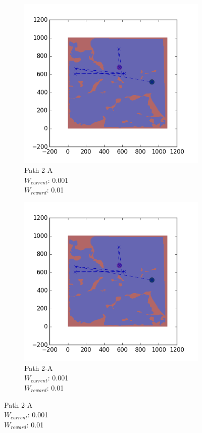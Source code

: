 \documentclass{tamuccthesis}
\begin{document}
\begin{figure}
\begin{subfigure}[b]{0.24\textwidth}
        \includegraphics[width=\textwidth,trim={4cm 3cm 2cm 3cm},clip]{EXP3RG_PathBa_-1_-1_0d001_0d01.png}
        \caption[]{{\small Path 2-A \\ $W_{current}$: 0.001 \\ $W_{reward}$: 0.01}}
        \label{fig:Path_2-A_upReward_upWork}
    \end{subfigure}
    \begin{subfigure}[b]{0.24\textwidth}
        \centering
        \includegraphics[width=\textwidth,trim={4cm 3cm 2cm 3cm},clip]{EXP3RG_PathBa_-1_-1_0d001_0d01.png}
        \caption[]{{\small Path 2-A \\ $W_{current}$: 0.001 \\ $W_{reward}$: 0.01}}
        \label{fig:Path_3-A_upReward_upWork}
    \end{subfigure}
    

\end{figure}
\end{document}

